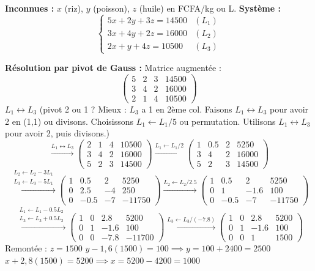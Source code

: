 \documentclass[11pt]{article}
\begin{document}
\begin{corrige}
\textbf{Inconnues :} $x$ (riz), $y$ (poisson), $z$ (huile) en FCFA/kg ou L.
\textbf{Système :}
\[
\begin{cases}
5x + 2y + 3z = 14500 & (L_1)\\
3x + 4y + 2z = 16000 & (L_2)\\
2x + y + 4z = 10500 & (L_3)
\end{cases}
\]

\textbf{Résolution par pivot de Gauss :}
Matrice augmentée :
\[
\left(\begin{array}{ccc|c}
5 & 2 & 3 & 14500 \\
3 & 4 & 2 & 16000 \\
2 & 1 & 4 & 10500
\end{array}\right)
\]
$L_1 \leftrightarrow L_3$ (pivot 2 ou 1 ? Mieux : $L_3$ a 1 en 2ème col. Faisons $L_1 \leftrightarrow L_3$ pour avoir 2 en (1,1) ou divisons. Choisissons $L_1 \leftarrow L_1/5$ ou permutation. Utilisons $L_1 \leftrightarrow L_3$ pour avoir 2, puis divisons.)
\[
\xrightarrow{L_1 \leftrightarrow L_3}
\left(\begin{array}{ccc|c}
2 & 1 & 4 & 10500 \\
3 & 4 & 2 & 16000 \\
5 & 2 & 3 & 14500
\end{array}\right)
\xrightarrow{L_1 \leftarrow L_1/2}
\left(\begin{array}{ccc|c}
1 & 0.5 & 2 & 5250 \\
3 & 4 & 2 & 16000 \\
5 & 2 & 3 & 14500
\end{array}\right)
\]
\[
\xrightarrow{\substack{L_2 \leftarrow L_2 - 3L_1 \\ L_3 \leftarrow L_3 - 5L_1}}
\left(\begin{array}{ccc|c}
1 & 0.5 & 2 & 5250 \\
0 & 2.5 & -4 & 250 \\
0 & -0.5 & -7 & -11750
\end{array}\right)
\xrightarrow{L_2 \leftarrow L_2/2.5}
\left(\begin{array}{ccc|c}
1 & 0.5 & 2 & 5250 \\
0 & 1 & -1.6 & 100 \\
0 & -0.5 & -7 & -11750
\end{array}\right)
\]
\[
\xrightarrow{\substack{L_1 \leftarrow L_1 - 0.5L_2 \\ L_3 \leftarrow L_3 + 0.5L_2}}
\left(\begin{array}{ccc|c}
1 & 0 & 2.8 & 5200 \\
0 & 1 & -1.6 & 100 \\
0 & 0 & -7.8 & -11700
\end{array}\right)
\xrightarrow{L_3 \leftarrow L_3 / (-7.8)}
\left(\begin{array}{ccc|c}
1 & 0 & 2.8 & 5200 \\
0 & 1 & -1.6 & 100 \\
0 & 0 & 1 & 1500
\end{array}\right)
\]
Remontée :
$z = 1500$
$y - 1,6(1500) = 100 \implies y = 100 + 2400 = 2500$
$x + 2,8(1500) = 5200 \implies x = 5200 - 4200 = 1000$


\end{corrige}
\end{document}
